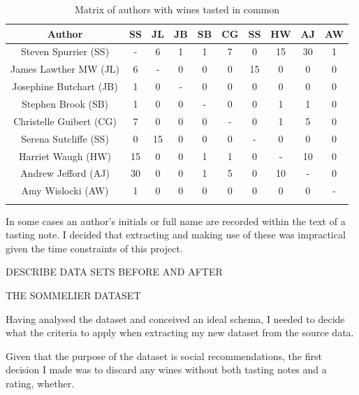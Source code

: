 \begin{table}[ht]
    \caption{Matrix of authors with wines tasted in common}
    \centering
    \begin{tabular}{c c c c c c c c c c}
        \\\hline\hline
        Author                   & SS & JL & JB & SB & CG & SS & HW & AJ & AW
        \\\hline
        Steven Spurrier (SS)     & -  & 6  & 1  & 1  & 7  & 0  & 15 & 30 & 1 \\
        James Lawther MW (JL)    & 6  & -  & 0  & 0  & 0  & 15 & 0  & 0  & 0 \\
        Josephine Butchart (JB)  & 1  & 0  & -  & 0  & 0  & 0  & 0  & 0  & 0 \\
        Stephen Brook (SB)       & 1  & 0  & 0  & -  & 0  & 0  & 1  & 1  & 0 \\
        Christelle Guibert (CG)  & 7  & 0  & 0  & 0  & -  & 0  & 1  & 5  & 0 \\
        Serena Sutcliffe (SS)    & 0  & 15 & 0  & 0  & 0  & -  & 0  & 0  & 0 \\
        Harriet Waugh (HW)       & 15 & 0  & 0  & 1  & 1  & 0  & -  & 10 & 0 \\
        Andrew Jefford (AJ)      & 30 & 0  & 0  & 1  & 5  & 0  & 10 & -  & 0 \\
        Amy Wislocki (AW)        & 1  & 0  & 0  & 0  & 0  & 0  & 0  & 0  & - \\
        \\\hline
    \end{tabular}
    \label{table:authormatrix}
\end{table}

In some cases an author's initials or full name are recorded within the text of a tasting note. I decided that extracting and making use of these was impractical given the time constraints of this project.

DESCRIBE DATA SETS BEFORE AND AFTER

THE SOMMELIER DATASET

Having analysed the dataset and conceived an ideal schema, I needed to decide what the criteria to apply when extracting my new dataset from the source data.

Given that the purpose of the dataset is social recommendations, the first decision I made was to discard any wines without both tasting notes and a rating, whether.


